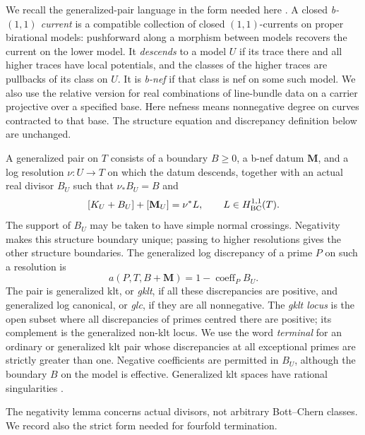 We recall the generalized-pair language in the form needed here
\cite[Section~2.1 and Definition~2.7]{DHY2023}.  A closed \emph{b-$(1,1)$
current} is a compatible collection of closed $(1,1)$-currents on
proper birational models: pushforward along a morphism between models
recovers the current on the lower model.  It \emph{descends} to a
model $U$ if its trace there and all higher traces have local
potentials, and the classes of the higher traces are pullbacks of
its class on $U$.
It is \emph{b-nef} if that class is nef on some such model.
We also use the relative version for real combinations of line-bundle
data on a carrier projective over a specified base.  Here nefness
means nonnegative degree on curves contracted to that base.  The
structure equation and discrepancy definition below are unchanged.

A generalized pair on $T$ consists of a boundary $B\geq0$, a b-nef
datum $\mathbf M$, and a log resolution $\nu:U\to T$ on which the
datum descends, together with an actual real divisor $B_U$ such that
$\nu_*B_U=B$ and
\begin{equation}\label{eq:generalized-structure}
 [K_U+B_U]+[\mathbf M_U]=\nu^*L,
 \qquad L\in H^{1,1}_{\mathrm{BC}}(T).
\end{equation}
The support of $B_U$ may be taken to have simple normal crossings.
Negativity makes this structure boundary unique; passing to higher
resolutions gives the other structure boundaries.  The generalized
log discrepancy of a prime $P$ on such a resolution is
\[
 a(P,T,B+\mathbf M)=1-\operatorname{coeff}_P B_U.
\]
The pair is generalized klt, or \emph{gklt}, if all these discrepancies
are positive, and generalized log canonical, or \emph{glc}, if they
are all nonnegative.  The \emph{gklt locus} is the open subset where
all discrepancies of primes centred there are positive; its
complement is the generalized non-klt locus.  We use the word
\emph{terminal} for an ordinary or
generalized klt pair whose discrepancies at all exceptional primes
are strictly greater than one.  Negative coefficients are permitted
in $B_U$, although the boundary $B$ on the model is effective.
Generalized klt spaces have rational singularities
\cite[Theorem~2.19]{DHY2023}.

The negativity lemma concerns actual divisors, not arbitrary
Bott--Chern classes.  We record also the strict form needed for
fourfold termination.


